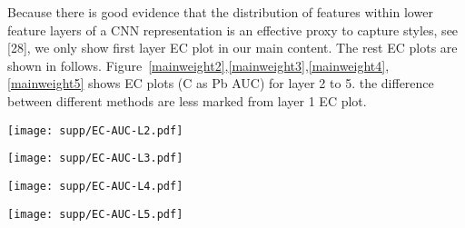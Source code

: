 Because there is good evidence that the distribution of features within lower feature layers of a CNN 
representation is an effective proxy to capture styles, see [28], we only show  first layer EC plot in our main content.
The rest EC plots are shown in follows.
Figure~\ref{mainweight2},\ref{mainweight3},\ref{mainweight4},\ref{mainweight5} shows EC plots (C as Pb AUC) for layer 2 to 5. the difference between different methods are less marked from layer 1 EC plot.
\begin{figure*}[!htbp]
\centering
    \texttt{[image: supp/EC-AUC-L2.pdf]}
\caption{\em An EC plot at layer2 compares 7 methods which respectively are Gatys, ACG, Universal style transfer, MCG, Gatys with histogram loss, Universal style transfer with higher weight, ACG with histogram loss.  }
\label{mainweight2}
\vspace{-7mm}
\end{figure*}

\begin{figure*}[!htbp]
\centering
    \texttt{[image: supp/EC-AUC-L3.pdf]}
\caption{\em An EC plot at layer3 compares 7 methods which respectively are Gatys, ACG, Universal style transfer, MCG, Gatys with histogram loss, Universal style transfer with higher weight, ACG with histogram loss.   }
\label{mainweight3}
\vspace{-7mm}
\end{figure*}
\begin{figure*}[!htbp]
\centering
    \texttt{[image: supp/EC-AUC-L4.pdf]}
\caption{\em An EC plot at layer4 compares 7 methods which respectively are Gatys, ACG, Universal style transfer, MCG, Gatys with histogram loss, Universal style transfer with higher weight, ACG with histogram loss.  }
\label{mainweight4}
\vspace{-7mm}
\end{figure*}
\begin{figure*}[!htbp]
\centering
    \texttt{[image: supp/EC-AUC-L5.pdf]}
\caption{\em An EC plot at layer5 compares 7 methods which respectively are Gatys, ACG, Universal style transfer, MCG, Gatys with histogram loss, Universal style transfer with higher weight, ACG with histogram loss.    }
\label{mainweight5}
\vspace{-7mm}
\end{figure*}



\FloatBarrier